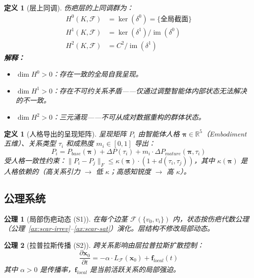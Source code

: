 \documentclass[11pt]{article}
\newtheorem{definition}[theorem]{定义}
\newtheorem{axiom}{公理}[section]
\begin{document}
\begin{definition}[层上同调]
\label{def:sheaf-cohomology}
伤疤层的上同调群为：
\begin{align}
H^0(K, \mathcal{F}) &= \ker(\delta^0) = \{\text{全局截面}\} \\
H^1(K, \mathcal{F}) &= \ker(\delta^1) / \operatorname{im}(\delta^0) \\
H^2(K, \mathcal{F}) &= C^2 / \operatorname{im}(\delta^1)
\end{align}
\textbf{解释：}
\begin{itemize}
\item $\dim H^0 > 0$：存在一致的全局自我呈现。
\item $\dim H^1 > 0$：存在\emph{不可约关系矛盾}——仅通过调整智能体内部状态无法解决的不一致。
\item $\dim H^2 > 0$：\emph{三元涌现}——不可从成对数据重构的群体状态。
\end{itemize}
\end{definition}

\begin{definition}[人格导出的呈现矩阵]
\label{def:presentation-matrices}
呈现矩阵 $P_i$ 由智能体人格 $\boldsymbol{\pi} \in \mathbb{R}^5$（Embodiment 五维）、关系类型 $\tau_i$ 和成熟度 $m_i \in [0,1]$ 导出：
\begin{equation}
P_i = P_{base}(\boldsymbol{\pi}) + \Delta P(\tau_i) + m_i \cdot \Delta P_{mature}(\boldsymbol{\pi}, \tau_i)
\end{equation}
受人格一致性约束：$\|P_i - P_j\|_F \leq \kappa(\boldsymbol{\pi}) \cdot (1 + d(\tau_i, \tau_j))$，其中 $\kappa(\boldsymbol{\pi})$ 是人格依赖的（高关系引力 $\to$ 低 $\kappa$；高感知锐度 $\to$ 高 $\kappa$）。
\end{definition}

\subsection{公理系统}

\begin{axiom}[局部伤疤动态 (S1)]
\label{ax:sheaf-local}
在每个边茎 $\mathcal{F}(\{v_0, v_i\})$ 内，状态按伤疤代数公理（公理~\ref{ax:scar-irrev}--\ref{ax:scar-sat}）演化。层结构不修改局部动态。
\end{axiom}

\begin{axiom}[拉普拉斯传播 (S2)]
\label{ax:sheaf-propagation}
跨关系影响由层拉普拉斯扩散控制：
\begin{equation}
\frac{\partial \mathbf{x}_0}{\partial t} = -\alpha \cdot L_\mathcal{F}(\mathbf{x}_0) + \mathbf{f}_{local}(t)
\end{equation}
其中 $\alpha > 0$ 是传播率，$\mathbf{f}_{local}$ 是当前活跃关系的局部强迫。
\end{axiom}
\end{document}
